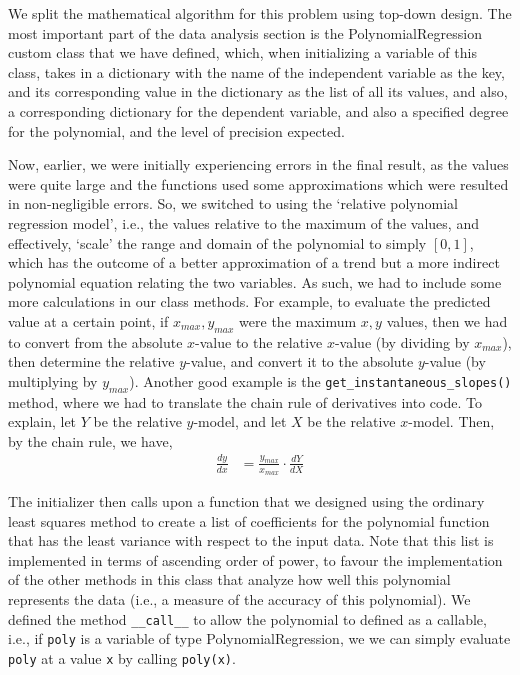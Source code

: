\documentclass[12pt]{article}
\begin{document}
\begin{enumerate}
\begin{text}
We split the mathematical algorithm for this problem using top-down design. The most important part of the data analysis section is the PolynomialRegression custom class that we have defined, which, when initializing a variable of this class, takes in a dictionary with the name of the independent variable as the key, and its corresponding value in the dictionary as the list of all its values, and also, a corresponding dictionary for the dependent variable, and also a specified degree for the polynomial, and the level of precision expected.

Now, earlier, we were initially experiencing errors in the final result, as the values were quite large and the functions used some approximations which were resulted in non-negligible errors. So, we switched to using the `relative polynomial regression model', i.e., the values relative to the maximum of the values, and effectively, `scale' the range and domain of the polynomial to simply $[0, 1]$, which has the outcome of a better approximation of a trend but a more indirect polynomial equation relating the two variables. As such, we had to include some more calculations in our class methods. For example, to evaluate the predicted value at a certain point, if $x_{max}, y_{max}$ were the maximum $x,y$ values, then we had to convert from the absolute $x$-value to the relative $x$-value (by dividing by $x_{max}$), then determine the relative $y$-value, and convert it to the absolute $y$-value (by multiplying by $y_{max}$). Another good example is the \texttt{get\_instantaneous\_slopes()} method, where we had to translate the chain rule of derivatives into code. To explain, let $Y$ be the relative $y$-model, and let $X$ be the relative $x$-model. Then, by the chain rule, we have,
\begin{align*}
    \frac{dy}{dx} &= \frac{y_{max}}{x_{max}} \cdot \frac{dY}{dX}
\end{align*}

The initializer then calls upon a function that we designed using the ordinary least squares method to create a list of coefficients for the polynomial function that has the least variance with respect to the input data. Note that this list is implemented in terms of ascending order of power, to favour the implementation of the other methods in this class that analyze how well this polynomial represents the data (i.e., a measure of the accuracy of this polynomial). We defined the method \texttt{\_\_call\_\_} to allow the polynomial to defined as a callable, i.e., if \texttt{poly} is a variable of type PolynomialRegression, we we can simply evaluate \texttt{poly} at a value \texttt{x} by calling \texttt{poly(x)}.


\end{text}
\end{enumerate}
\end{document}
